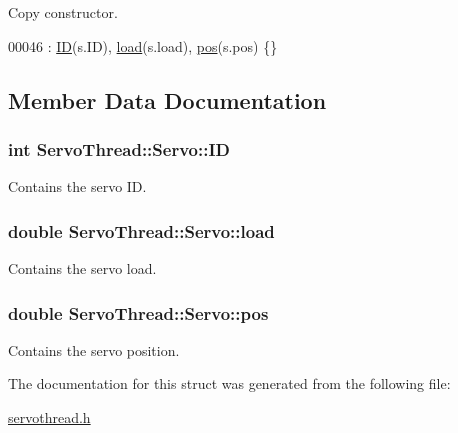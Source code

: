 Copy constructor. 


\begin{DoxyCode}
00046 : \hyperlink{struct_servo_thread_1_1_servo_a06b514c42113aa85fd1703fc88fca7ce}{ID}(s.ID), \hyperlink{struct_servo_thread_1_1_servo_ae378d77acf16b306649c87fdb8df677e}{load}(s.load), \hyperlink{struct_servo_thread_1_1_servo_a9fa0aa56944b9b0bb9d66303d5bd4b59}{pos}(s.pos) \{\}
\end{DoxyCode}


\subsection{Member Data Documentation}
\hypertarget{struct_servo_thread_1_1_servo_a06b514c42113aa85fd1703fc88fca7ce}{}
\subsubsection[{I\+D}]{\setlength{\rightskip}{0pt plus 5cm}int Servo\+Thread\+::\+Servo\+::\+I\+D}\label{struct_servo_thread_1_1_servo_a06b514c42113aa85fd1703fc88fca7ce}


Contains the servo I\+D. 

\hypertarget{struct_servo_thread_1_1_servo_ae378d77acf16b306649c87fdb8df677e}{}
\subsubsection[{load}]{\setlength{\rightskip}{0pt plus 5cm}double Servo\+Thread\+::\+Servo\+::load}\label{struct_servo_thread_1_1_servo_ae378d77acf16b306649c87fdb8df677e}


Contains the servo load. 

\hypertarget{struct_servo_thread_1_1_servo_a9fa0aa56944b9b0bb9d66303d5bd4b59}{}
\subsubsection[{pos}]{\setlength{\rightskip}{0pt plus 5cm}double Servo\+Thread\+::\+Servo\+::pos}\label{struct_servo_thread_1_1_servo_a9fa0aa56944b9b0bb9d66303d5bd4b59}


Contains the servo position. 



The documentation for this struct was generated from the following file\+:\begin{DoxyCompactItemize}
\item 
\hyperlink{servothread_8h}{servothread.\+h}\end{DoxyCompactItemize}
